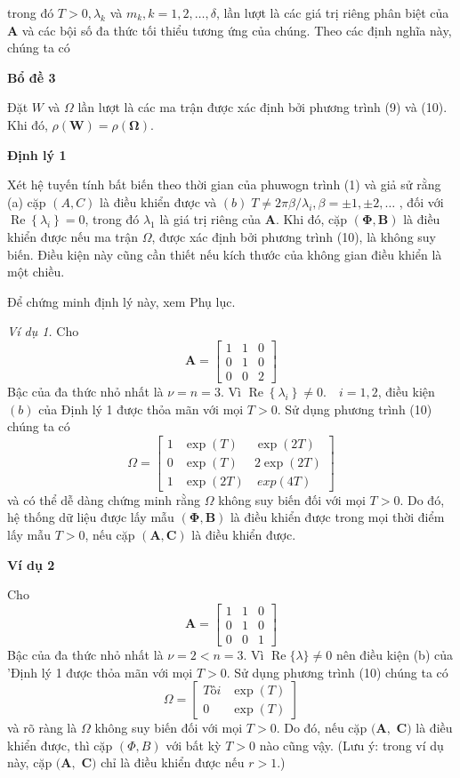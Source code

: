 \documentclass[12pt,a4paper]{article}
\begin{document}
trong đó $T>0, \lambda_k$ và $m_k, k=1,2, \ldots, \delta$, lần lượt là các giá trị riêng phân biệt của $\mathbf{A}$ và các bội số đa thức tối thiểu tương ứng của chúng. Theo các định nghĩa này, chúng ta có

\textbf{Bổ đề 3}

Đặt $W$ và $\Omega$ lần lượt là các ma trận được xác định bởi phương trình (9) và (10). Khi đó, $\rho(\mathbf{W})=\rho(\boldsymbol{\Omega}) $.

\textbf{Định lý 1}

Xét hệ tuyến tính bất biến theo thời gian của phuwogn trình (1) và giả sử rằng (a) cặp $(A, C)$ là điều khiển được và $(b)\; T \neq 2 \pi \beta / \lambda_i, \beta= \pm 1, \pm 2, \ldots$ , đối với $\operatorname{Re}\left\{\lambda_i\right\}=0$, trong đó $\lambda_1$ là giá trị riêng của $\mathbf{A}$. Khi đó, cặp $(\boldsymbol{\Phi}, \mathbf{B})$ là điều khiển được nếu ma trận $\Omega$, được xác định bởi phương trình (10), là không suy biến. Điều kiện này cũng cần thiết nếu kích thước của không gian điều khiển là một chiều.

Để chứng minh định lý này, xem Phụ lục.

\textit{Ví dụ 1.}
Cho 
$$
\boldsymbol{A}=\left[\begin{array}{lll}
	1 & 1 & 0 \\
	0 & 1 & 0 \\
	0 & 0 & 2
\end{array}\right]
$$
Bậc của đa thức nhỏ nhất là $\nu=n=3$. Vì $\operatorname{Re}\left\{\lambda_i\right\} \neq 0 . \quad i=1,2$, điều kiện $(b)$ của Định lý 1 được thỏa mãn với mọi $T>0$. Sử dụng phương trình (10) chúng ta có
$$
\Omega=\left[\begin{array}{ccc}
	1 & \exp (T) & \exp (2 T) \\
	0 & \exp (T) & 2 \exp (2 T) \\
	1 & \exp (2 T) & \ exp (4 T)
\end{array}\right]
$$
và có thể dễ dàng chứng minh rằng $\Omega$ không suy biến đối với mọi $T>0$. Do đó, hệ thống dữ liệu được lấy mẫu $(\boldsymbol{\Phi}, \mathbf{B})$ là điều khiển được trong mọi thời điểm lấy mẫu $T>0$, nếu cặp $(\mathbf{A}, \mathbf{C })$ là điều khiển được.

\textbf{Ví dụ 2}

Cho 
$$
\mathbf{A}=\left[\begin{array}{lll}
	1 & 1 & 0 \\
	0 & 1 & 0 \\
	0 & 0 & 1
\end{array}\right]
$$
Bậc của đa thức nhỏ nhất là $\nu=2<n=3$. Vì $\operatorname{Re}\{\lambda\} \neq 0$ nên điều kiện (b) của 'Định lý 1 được thỏa mãn với mọi $T>0$. Sử dụng phương trình (10) chúng ta có
$$
\Omega=\left[\begin{array}{ll}
	Tôi & \exp (T) \\
	0 & \exp (T)
\end{array}\right]
$$
và rõ ràng là $\Omega$ không suy biến đối với mọi $T>0$. Do đó, nếu cặp $(\boldsymbol{A},$ $\boldsymbol{C})$ là điều khiển được, thì cặp $(\Phi, B)$ với bất kỳ $T>0$ nào cũng vậy. (Lưu ý: trong ví dụ này, cặp $(\boldsymbol{A},$ $\boldsymbol{C})$ chỉ là điều khiển được nếu $r>1$.)
\end{document}
